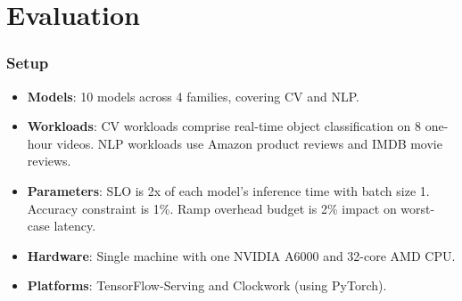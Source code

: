 \documentclass[12pt,aspectratio=169]{beamer}
\begin{document}
    \section{Evaluation}

    \begin{frame}
        \frametitle{Setup}

        \begin{itemize}
            \setlength{\itemsep}{.8em}
            \item \textbf{Models}: 10 models across 4 families, covering CV and NLP.
            \item \textbf{Workloads}: CV workloads comprise real-time object classification on 8 one-hour videos. NLP
                                      workloads use Amazon product reviews and IMDB movie reviews.
            \item \textbf{Parameters}: SLO is 2x of each model's inference time with batch size 1. Accuracy constraint
                                       is 1\%. Ramp overhead budget is 2\% impact on worst-case latency.
            \item \textbf{Hardware}: Single machine with one NVIDIA A6000 and 32-core AMD CPU.
            \item \textbf{Platforms}: TensorFlow-Serving and Clockwork (using PyTorch).
        \end{itemize}
    \end{frame}
\end{document}
